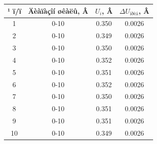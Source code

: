 \begin{tabular}{|c|c|c|c|}
\hline
¹ ï/ï & Äèàïàçîí øêàëû, Â & $U_i$, Â & $\Delta U_{\text{ïðèá}}$, Â \\
\hline
1 & 0-10 & 0.350 & 0.0026 \\
2 & 0-10 & 0.349 & 0.0026 \\
3 & 0-10 & 0.350 & 0.0026 \\
4 & 0-10 & 0.352 & 0.0026 \\
5 & 0-10 & 0.351 & 0.0026 \\
6 & 0-10 & 0.352 & 0.0026 \\
7 & 0-10 & 0.350 & 0.0026 \\
8 & 0-10 & 0.351 & 0.0026 \\
9 & 0-10 & 0.351 & 0.0026 \\
10 & 0-10 & 0.349 & 0.0026 \\
\hline
\end{tabular}
